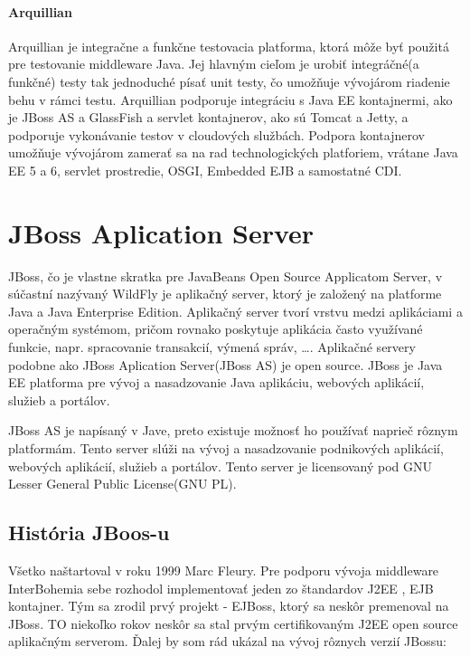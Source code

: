 \subsubsection{Arquillian}
Arquillian je integračne a funkčne testovacia platforma, ktorá môže byť použitá pre testovanie middleware Java. Jej hlavným cieľom je urobiť integráčné(a funkčné) testy tak jednoduché písať unit testy, čo umožňuje vývojárom riadenie behu v rámci testu. 
Arquillian podporuje integráciu s Java EE kontajnermi, ako je JBoss AS a GlassFish a servlet kontajnerov, ako sú Tomcat a Jetty, a podporuje vykonávanie testov v cloudových službách. Podpora kontajnerov umožňuje vývojárom zamerať sa na rad technologických platforiem, vrátane Java EE 5 a 6, servlet prostredie, OSGI, Embedded EJB a samostatné CDI.\cite{arqbook}


\chapter{JBoss Aplication Server} 
JBoss, čo je vlastne skratka pre JavaBeans Open Source Applicatom Server, v súčastní nazývaný WildFly je aplikačný server, ktorý je založený na platforme Java a Java Enterprise Edition.\cite{jbossbook} Aplikačný server tvorí vrstvu medzi aplikáciami a operačným systémom, pričom rovnako poskytuje aplikácia často využívané funkcie, napr. spracovanie transakcií, výmená správ, \ldots . Aplikačné servery podobne ako JBoss Aplication Server(JBoss AS) je open source. JBoss je Java EE platforma pre vývoj a nasadzovanie Java aplikáciu, webových aplikácií, služieb a portálov.

 JBoss AS je napísaný v Jave, preto existuje možnosť  ho používať naprieč rôznym platformám. Tento server slúži na vývoj a nasadzovanie podnikových aplikácií, webových aplikácií, služieb a portálov. Tento server je licensovaný pod GNU Lesser General Public License(GNU PL).

\section{História JBoos-u}
Všetko naštartoval v roku 1999 Marc Fleury. Pre podporu vývoja middleware InterBohemia sebe rozhodol implementovať jeden zo štandardov J2EE , EJB kontajner. Tým sa zrodil prvý projekt - EJBoss, ktorý sa neskôr premenoval na JBoss. TO niekoľko rokov neskôr sa stal prvým certifikovaným  J2EE  open source aplikačným serverom. Ďalej by som rád ukázal na vývoj rôznych verzií JBossu:\cite{jbossWeb}


